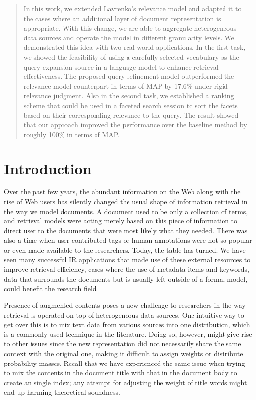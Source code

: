 \begin{abstract} In this work, we extended Lavrenko's relevance model
\cite{lavrenko2001relevance} and adapted it to the cases where an additional
layer of document representation is appropriate.  With this
change, we are able to aggregate heterogeneous data sources and operate the
model in different granularity levels.  We demonstrated this idea with two
real-world applications.  In the first task, we showed the feasibility of using
a carefully-selected vocabulary as the query expansion source in a language
model to enhance retrieval effectiveness.  The proposed query refinement model
outperformed the relevance model counterpart in terms of MAP by 17.6\% under
rigid relevance judgment.  Also in the second task, we established a ranking
scheme that could be used in a faceted search session to sort the facets based
on their corresponding relevance to the query.  The result showed that our
approach improved the performance over the baseline method by roughly 100\% in
terms of MAP.  \end{abstract}

\section{Introduction}

Over the past few years, the abundant information on the Web along with the
rise of Web users has silently changed the usual shape of information retrieval
in the way we model documents.  A document used to be only a collection of
terms, and retrieval models were acting merely based on this piece of
information to direct user to the documents that were most likely what they
needed.  There was also a time when user-contributed tags or human annotations
were not so popular or even made available to the researchers.  Today, the
table has turned.  We have seen many successful IR applications that made use
of these external resources to improve retrieval efficiency, cases where the
use of metadata items and keywords, data that surrounds the documents but is
usually left outside of a formal model, could benefit the research field.  

Presence of augmented contents poses a new challenge to researchers in the way
retrieval is operated on top of heterogeneous data sources.  One intuitive way
to get over this is to mix text data from various sources into one
distribution, which is a commonly-used technique in the literature.  Doing so,
however, might give rise to other issues since the new representation did not
necessarily share the same context with the original one, making it difficult
to assign weights or distribute probability masses.  Recall that we have
experienced the same issue when trying to mix the contents in the document
title with that in the document body to create an single index; any attempt for
adjusting the weight of title words might end up harming theoretical soundness.


